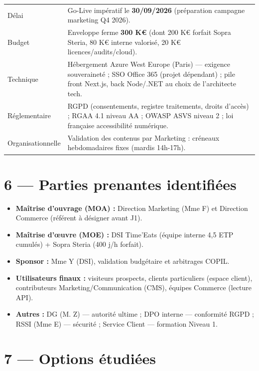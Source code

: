 \documentclass[11pt,a4paper,oneside]{report}
\begin{document}
\renewcommand{\arraystretch}{1.3}
\begin{tabularx}{\textwidth}{L{3cm} Y}
\toprule
{} &  \\
\midrule
Délai & Go-Live impératif le \textbf{30/09/2026} (préparation campagne marketing Q4 2026). \\
Budget & Enveloppe ferme \textbf{300 K€} (dont 200 K€ forfait Sopra Steria, 80 K€ interne valorisé, 20 K€ licences/audits/cloud). \\
Technique & Hébergement Azure West Europe (Paris) — exigence souveraineté ; SSO Office 365 (projet dépendant) ; pile front Next.js, back Node/.NET au choix de l'architecte tech. \\
Réglementaire & RGPD (consentements, registre traitements, droits d'accès) ; RGAA 4.1 niveau AA ; OWASP ASVS niveau 2 ; loi française accessibilité numérique. \\
Organisationnelle & Validation des contenus par Marketing : créneaux hebdomadaires fixes (mardis 14h-17h). \\
\bottomrule
\end{tabularx}

\section*{6 — Parties prenantes identifiées}

\begin{itemize}
  \item \textbf{Maîtrise d'ouvrage (MOA) :} Direction Marketing (Mme F) et Direction Commerce (référent à désigner avant J1).
  \item \textbf{Maîtrise d'œuvre (MOE) :} DSI Time'Eats (équipe interne 4{,}5 ETP cumulés) + Sopra Steria (400 j/h forfait).
  \item \textbf{Sponsor :} Mme Y (DSI), validation budgétaire et arbitrages COPIL.
  \item \textbf{Utilisateurs finaux :} visiteurs prospects, clients particuliers (espace client), contributeurs Marketing/Communication (CMS), équipes Commerce (lecture API).
  \item \textbf{Autres :} DG (M. Z) — autorité ultime ; DPO interne — conformité RGPD ; RSSI (Mme E) — sécurité ; Service Client — formation Niveau 1.
\end{itemize}

\section*{7 — Options étudiées}
\end{document}
